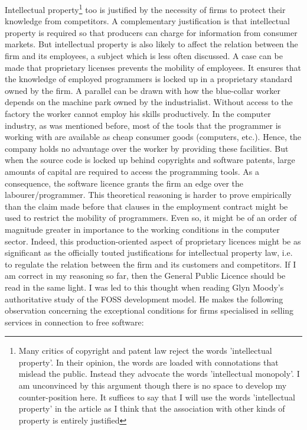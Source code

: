 Intellectual property\footnote{Many critics of copyright and patent law reject
the words 'intellectual property'. In their opinion, the words are loaded with
connotations that mislead the public. Instead they advocate the words
'intellectual monopoly'. I am unconvinced by this argument though there is no
space to develop my counter-position here. It suf\hbox{}f\hbox{}ices to say that I will
use the words 'intellectual property' in the article as I think that the
association with other kinds of property is entirely justif\hbox{}ied} too is
justified by the necessity of f\hbox{}irms to protect their knowledge from
competitors. A complementary justif\hbox{}ication is that intellectual property is
required so that producers can charge for information from consumer markets. But
intellectual property is also likely to af\hbox{}fect the relation between the f\hbox{}irm
and its employees, a subject which is less often discussed. A case can be made
that proprietary licenses prevents the mobility of employees. It ensures that
the knowledge of employed programmers is locked up in a proprietary standard
owned by the f\hbox{}irm. A parallel can be drawn with how the blue-collar worker
depends on the machine park owned by the industrialist.  Without access to the
factory the worker cannot employ his skills productively.  In the computer
industry, as was mentioned before, most of the tools that the programmer is
working with are available as cheap consumer goods (computers, etc.). Hence, the
company holds no advantage over the worker by providing these facilities. But
when the source code is locked up behind copyrights and software patents, large
amounts of capital are required to access the programming tools.  As a
consequence, the software licence grants the f\hbox{}irm an edge over the
labourer/programmer. This theoretical reasoning is harder to prove empirically
than the claim made before that clauses in the employment contract might be used
to restrict the mobility of programmers. Even so, it might be of an order of
magnitude greater in importance to the working conditions in the computer
sector. Indeed, this production-oriented aspect of proprietary licences might be
as signif\hbox{}icant as the of\hbox{}ficially touted justif\hbox{}ications for intellectual
property law, i.e. to regulate the relation between the f\hbox{}irm and its customers
and competitors. If I am correct in my reasoning so far, then the General Public
Licence should be read in the same light. I was led to this thought when reading
Glyn Moody's authoritative study of the FOSS development model. He makes the
following observation concerning the exceptional conditions for f\hbox{}irms
specialised in selling services in connection to free software: 

